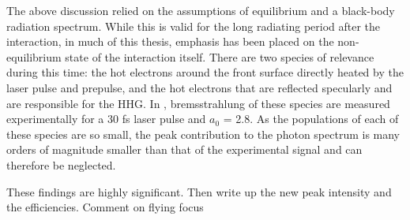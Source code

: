 The above discussion relied on the assumptions of equilibrium and a black-body radiation spectrum.
While this is valid for the long radiating period after the interaction, in much of this thesis, emphasis has been placed on the non-equilibrium state of the interaction itself. There are two species of relevance during this time: the hot electrons around the front surface directly heated by the laser pulse and prepulse, and the hot electrons that are reflected specularly and are responsible for the HHG. In \cite{zulickHighResolutionBremsstrahlung2013}, bremsstrahlung of these species are measured experimentally for a 30 fs laser pulse and $a_0$ = 2.8. As the populations of each of these species are so small, the peak contribution to the photon spectrum is many orders of magnitude smaller than that of the experimental signal and can therefore be neglected.

These findings are highly significant. 
Then write up the new peak intensity and the efficiencies.
Comment on flying focus


